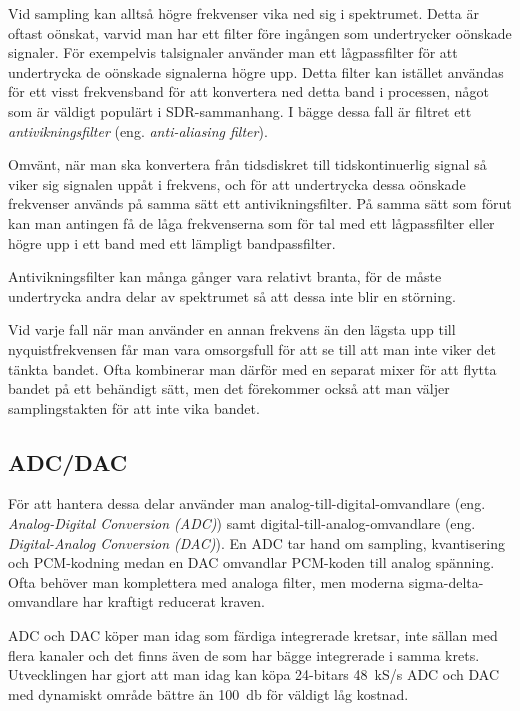 Vid sampling kan alltså högre frekvenser vika ned sig i spektrumet.
Detta är oftast oönskat, varvid man har ett filter före ingången som
undertrycker oönskade signaler.
För exempelvis talsignaler använder man ett lågpassfilter för att undertrycka de
oönskade signalerna högre upp.
Detta filter kan istället användas för ett visst frekvensband för att
konvertera ned detta band i processen, något som är väldigt populärt i
SDR-sammanhang.
I bägge dessa fall är filtret ett \emph{antivikningsfilter} (eng.
\emph{anti-aliasing filter}).

Omvänt, när man ska konvertera från tidsdiskret till tidskontinuerlig
signal så viker sig signalen uppåt i frekvens, och för att undertrycka dessa
oönskade frekvenser används på samma sätt ett antivikningsfilter.
På samma sätt som förut kan man antingen få de låga frekvenserna som för tal
med ett lågpassfilter eller högre upp i ett band med ett lämpligt
bandpassfilter.

Antivikningsfilter kan många gånger vara relativt branta, för de måste
undertrycka andra delar av spektrumet så att dessa inte blir en störning.

Vid varje fall när man använder en annan frekvens än den lägsta upp till
nyquistfrekvensen får man vara omsorgsfull för att se till att man inte viker
det tänkta bandet.
Ofta kombinerar man därför med en separat mixer för att flytta bandet på ett
behändigt sätt, men det förekommer också att man väljer samplingstakten för att
inte vika bandet.

\subsection{ADC/DAC}

För att hantera dessa delar använder man analog-till-digital-omvandlare
(eng. \emph{Analog-Digital Conversion (ADC)}) samt digital-till-analog-omvandlare 
(eng. \emph{Digital-Analog Conversion (DAC)}).
En ADC tar hand om sampling, kvantisering och PCM-kodning medan en DAC
omvandlar PCM-koden till analog spänning.
Ofta behöver man komplettera med analoga filter, men moderna sigma-delta-omvandlare 
har kraftigt reducerat kraven.

ADC och DAC köper man idag som färdiga integrerade kretsar, inte sällan med
flera kanaler och det finns även de som har bägge integrerade i samma krets.
Utvecklingen har gjort att man idag kan köpa 24-bitars 48~kS/s ADC och DAC med
dynamiskt område bättre än \SI{100}{\decibel} för väldigt låg kostnad.
